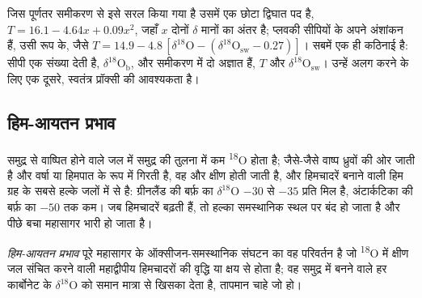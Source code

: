 जिस पूर्णतर समीकरण से इसे सरल किया गया है उसमें एक छोटा द्विघात पद है,
$T = 16.1 - 4.64x + 0.09x^2$, जहाँ $x$ दोनों $\delta$ मानों का अंतर है; प्लवकी सीपियों के
अपने अंशांकन हैं, उसी रूप के, जैसे $T = 14.9 - 4.8\,[\delta^{18}\mathrm{O} -
(\delta^{18}\mathrm{O}_{\mathrm{sw}} - 0.27)]$। सबमें एक ही कठिनाई है: सीपी एक
संख्या देती है, $\delta^{18}\mathrm{O}_{\mathrm{b}}$, और समीकरण में दो अज्ञात हैं, $T$ और
$\delta^{18}\mathrm{O}_{\mathrm{sw}}$। उन्हें अलग करने के लिए एक दूसरे, स्वतंत्र प्रॉक्सी की आवश्यकता है।

\subsection*{हिम-आयतन प्रभाव}

समुद्र से वाष्पित होने वाले जल में समुद्र की तुलना में कम \textsuperscript{18}O होता है; जैसे-जैसे वाष्प
ध्रुवों की ओर जाती है और वर्षा या हिमपात के रूप में गिरती है, वह और क्षीण होती जाती है, और हिमचादरें
बनाने वाली हिम ग्रह के सबसे हल्के जलों में से है: ग्रीनलैंड की बर्फ़ का $\delta^{18}$O $-30$ से $-35$
प्रति मिल है, अंटार्कटिका की बर्फ़ का $-50$ तक कम। जब हिमचादरें बढ़ती हैं, तो हल्का समस्थानिक स्थल पर बंद हो जाता है
और पीछे बचा महासागर भारी हो जाता है।

\begin{definition}[हिम-आयतन प्रभाव]\label{def:b2:climate-proxies:ice-volume}
\emph{हिम-आयतन प्रभाव} पूरे महासागर के ऑक्सीजन-समस्थानिक
संघटन का वह परिवर्तन है जो \textsuperscript{18}O में क्षीण जल संचित करने वाली महाद्वीपीय हिमचादरों
की वृद्धि या क्षय से होता है; वह समुद्र में बनने वाले हर कार्बोनेट के $\delta^{18}$O को समान मात्रा से
खिसका देता है, तापमान चाहे जो हो।
\end{definition}


